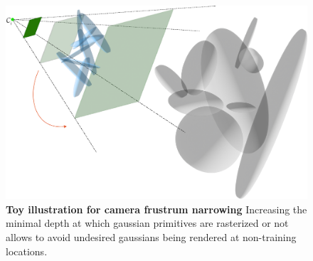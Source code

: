 \begin{figure}[htb!]
  \center
\includegraphics[width=.7\linewidth]{images/gaussiansplatting/gaussian-floaters.png}
\caption{\textbf{Toy illustration for camera frustrum narrowing} Increasing the minimal depth at which gaussian primitives are rasterized or not allows to avoid undesired gaussians being rendered at non-training locations.}
\label{fig:floater-limitation}
\end{figure}

